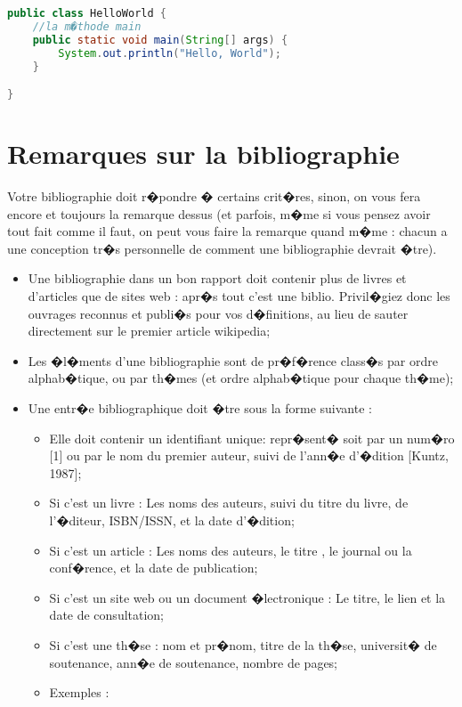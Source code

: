 \begin{spacing}{1.2}
\begin{lstlisting}[label=code:java,caption=Helloworld Java,language=java]
	public class HelloWorld {
	//la m�thode main
    public static void main(String[] args) {
        System.out.println("Hello, World");
    }

}
\end{lstlisting}

\section{Remarques sur la bibliographie}
Votre bibliographie doit r�pondre � certains crit�res, sinon, on vous fera encore et
toujours la remarque dessus (et parfois, m�me si vous pensez avoir tout fait comme il
 faut, on peut vous faire la remarque quand m�me : chacun a une conception tr�s
personnelle de comment une bibliographie devrait �tre).\\
\begin{itemize}
\item Une bibliographie dans un bon rapport doit contenir plus de livres et d'articles 
que de sites web : apr�s tout c'est une biblio. Privil�giez donc les ouvrages
reconnus et publi�s pour vos d�finitions, au lieu de sauter directement sur le premier article wikipedia;
 \item Les �l�ments d'une bibliographie sont de pr�f�rence class�s par ordre
alphab�tique, ou par th�mes (et ordre alphab�tique pour chaque th�me);
\item Une entr�e bibliographique doit �tre sous la forme suivante :
\begin{itemize}
\item Elle doit contenir un identifiant unique: repr�sent� soit par un num�ro
[1] ou par le nom du premier auteur, suivi de l'ann�e d'�dition [Kuntz, 1987];
\item Si c'est un livre : Les noms des auteurs, suivi du titre du livre, de l'�diteur, 
ISBN/ISSN, et la date d'�dition;
\item Si c'est un article : Les noms des auteurs, le titre , le journal ou la
conf�rence, et la date de publication;
\item Si c'est un site web ou un document �lectronique : Le titre, le lien et la date 
de consultation;
\item Si c'est une th�se : nom et pr�nom, titre de la th�se, universit� de
soutenance, ann�e de soutenance, nombre de pages;
\item Exemples : 
\begin{description}

\end{description}
\end{itemize}
\end{itemize}
\end{spacing}
